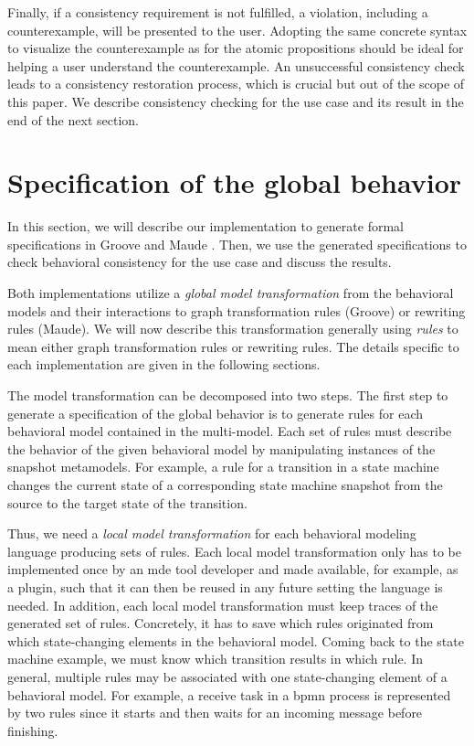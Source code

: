 \documentclass{jot}
\begin{document}
Finally, if a consistency requirement is not fulfilled, a violation, including a counterexample, will be presented to the user.
Adopting the same concrete syntax to visualize the counterexample as for the atomic propositions should be ideal for helping a user understand the counterexample. 
An unsuccessful consistency check leads to a consistency restoration process, which is crucial but out of the scope of this paper.
We describe consistency checking for the use case and its result in the end of the next section.


\section{Specification of the global behavior} \label{sec:specification_of_the_global_behavior}
In this section, we will describe our implementation to generate formal specifications in Groove \cite{ghamarianModellingAnalysisUsing2012, rensinkGROOVESimulatorTool2004} and Maude \cite{manuelclavelAllMaudeHighPerformance2007}.
Then, we use the generated specifications to check behavioral consistency for the use case and discuss the results.

Both implementations utilize a \textit{global model transformation} from the behavioral models and their interactions to graph transformation rules (Groove) or rewriting rules (Maude).
We will now describe this transformation generally using \textit{rules} to mean either graph transformation rules or rewriting rules.
The details specific to each implementation are given in the following sections.

The model transformation can be decomposed into two steps.
The first step to generate a specification of the global behavior is to generate rules for each behavioral model contained in the multi-model.
Each set of rules must describe the behavior of the given behavioral model by manipulating instances of the snapshot metamodels.
For example, a rule for a transition in a state machine changes the current state of a corresponding state machine snapshot from the source to the target state of the transition. 

Thus, we need a \emph{local model transformation} for each behavioral modeling language producing sets of rules.
Each local model transformation only has to be implemented once by an \gls*{mde} tool developer and made available, for example, as a plugin, such that it can then be reused in any future setting the language is needed.
In addition, each local model transformation must keep traces of the generated set of rules.
Concretely, it has to save which rules originated from which state-changing elements in the behavioral model.
Coming back to the state machine example, we must know which transition results in which rule.
In general, multiple rules may be associated with one state-changing element of a behavioral model.
For example, a receive task in a \gls*{bpmn} process is represented by two rules since it starts and then waits for an incoming message before finishing.
\end{document}
